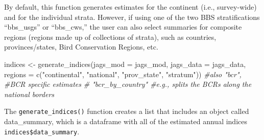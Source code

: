 \documentclass[
]{book}
\newenvironment{Shaded}{\begin{snugshade}}{\end{snugshade}}
\newcommand{\AttributeTok}[1]{\textcolor[rgb]{0.77,0.63,0.00}{#1}}
\newcommand{\CommentTok}[1]{\textcolor[rgb]{0.56,0.35,0.01}{\textit{#1}}}
\newcommand{\DecValTok}[1]{\textcolor[rgb]{0.00,0.00,0.81}{#1}}
\newcommand{\FunctionTok}[1]{\textcolor[rgb]{0.00,0.00,0.00}{#1}}
\newcommand{\NormalTok}[1]{#1}
\newcommand{\OtherTok}[1]{\textcolor[rgb]{0.56,0.35,0.01}{#1}}
\newcommand{\SpecialCharTok}[1]{\textcolor[rgb]{0.00,0.00,0.00}{#1}}
\newcommand{\StringTok}[1]{\textcolor[rgb]{0.31,0.60,0.02}{#1}}
\begin{document}
By default, this function generates estimates for the continent (i.e., survey-wide) and for the individual strata. However, if using one of the two BBS stratifications ``bbs\_usgs'' or ``bbs\_cws,'' the user can also select summaries for composite regions (regions made up of collections of strata), such as countries, provinces/states, Bird Conservation Regions, etc.

\begin{Shaded}
\begin{Highlighting}[]
\NormalTok{indices }\OtherTok{\textless{}{-}} \FunctionTok{generate\_indices}\NormalTok{(}\AttributeTok{jags\_mod =}\NormalTok{ jags\_mod,}
                            \AttributeTok{jags\_data =}\NormalTok{ jags\_data,}
                            \AttributeTok{regions =} \FunctionTok{c}\NormalTok{(}\StringTok{"continental"}\NormalTok{,}
                            \StringTok{"national"}\NormalTok{,}
                            \StringTok{"prov\_state"}\NormalTok{,}
                            \StringTok{"stratum"}\NormalTok{))}
                            \CommentTok{\#also "bcr", \#BCR specific estimates}
                            \CommentTok{\# "bcr\_by\_country" \#e.g., splits the BCRs along the national borders}
\end{Highlighting}
\end{Shaded}

The \texttt{generate\_indices()} function creates a list that includes an object called data\_summary, which is a dataframe with all of the estimated annual indices \texttt{indices\$data\_summary}.

\begin{Shaded}
\end{Shaded}
\end{document}

